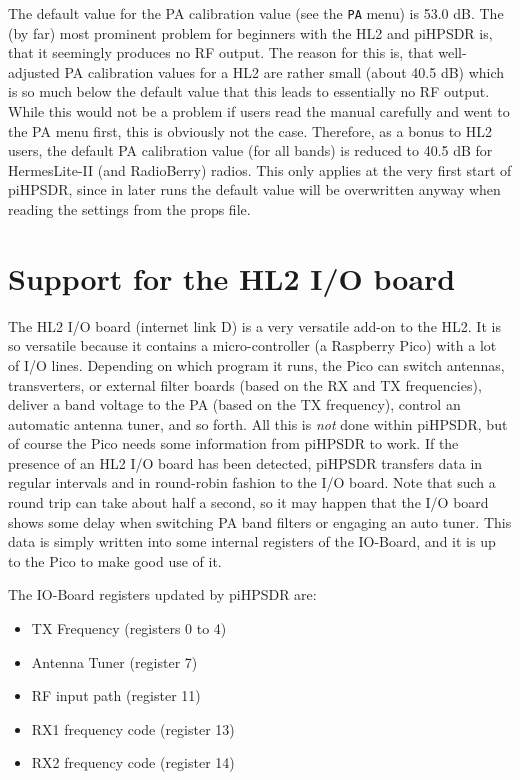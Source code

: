 \documentclass[12pt]{book}
\def\bltt#1{\texttt{\color{blue}#1}}
\def\pH{pi\-HPSDR\xspace}
\begin{document}
The default value for the PA calibration value (see the \bltt{PA} menu) is 53.0 dB. The (by far) most
prominent  problem for beginners with the HL2 and \pH is, that it seemingly produces no RF output. The reason for this
is, that well-adjusted PA calibration values for a HL2 are rather small (about 40.5 dB) which is
so much below the default
value that this leads to essentially no RF output. While this would not be a problem if  users read the manual
carefully and went to the PA menu first, this is obviously not the case. Therefore, as a bonus to HL2 users,
the default PA calibration value (for all bands) is
reduced to 40.5 dB for HermesLite-II (and RadioBerry) radios. This only applies at the very first start
of \pH, since in later runs the default value will be overwritten anyway when reading the settings from
the props file.

\section{Support for the HL2 I/O board}

The HL2 I/O board (internet link D) is a very versatile add-on to the HL2. It is so versatile
because it contains a  micro-controller (a Raspberry Pico) with a lot
of I/O lines. Depending on which program it runs,
the Pico can switch antennas, transverters, or external filter boards
(based on the RX and TX frequencies),
deliver a band voltage to the PA (based on the TX frequency), control an
automatic antenna tuner, and so forth. All this is \textit{not} done within \pH, but of
course the Pico needs some information from \pH to work.
If the presence of an HL2 I/O board has been detected,
\pH transfers data in regular intervals and in round-robin fashion to the I/O board. Note that
such a round trip can take about half a second, so it may happen that the I/O board
shows some delay when switching PA band filters or engaging an auto tuner. This data is simply
written into some internal registers of the IO-Board, and it is up to the Pico to make
good use of it.

The IO-Board registers updated by \pH are:

\begin{itemize}
\item{TX Frequency (registers 0 to 4)}
\item{Antenna Tuner (register 7)}
\item{RF input path (register 11)}
\item{RX1 frequency code (register 13)}
\item{RX2 frequency code (register 14)}
\end{itemize}
\end{document}
